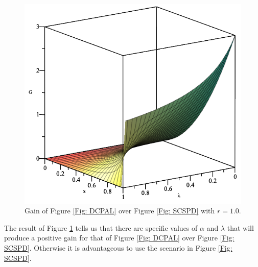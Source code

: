 \documentclass[twocolumn]{article}
\begin{document}
\begin{figure}[ht]
    \centering
    \includegraphics[scale=0.35]{Depolarizing-Double-Channel-Alpha-and-Lambda-r=1-Gain-Graph.png}
    \caption{\footnotesize{Gain of Figure \ref{Fig: DCPAL} over Figure \ref{Fig: SCSPD} with $r=1.0$.}}
    \label{Fig: DCDALR1G}
\end{figure}
\par \noindent
The result of Figure \ref{Fig: DCDALR1G} tells us that there are specific values of $\alpha$ and $\lambda$ that will produce a positive gain for that of Figure \ref{Fig: DCPAL} over Figure \ref{Fig: SCSPD}. Otherwise it is advantageous to use the scenario in Figure \ref{Fig: SCSPD}.
\end{document}
